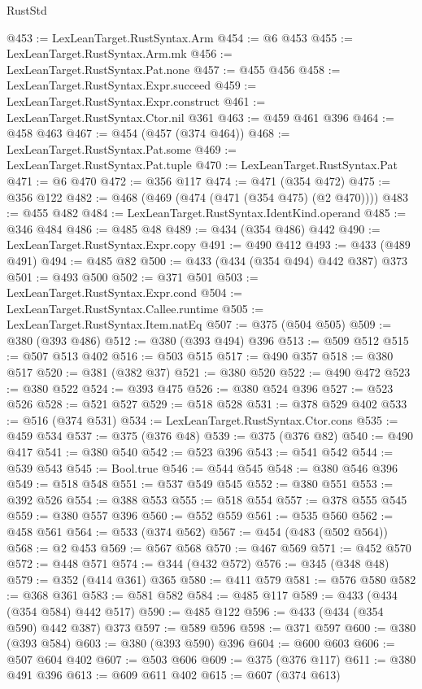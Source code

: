 \begin{lexlean}{RustStd}
\begin{coremodule}
@453 := LexLeanTarget.RustSyntax.Arm
@454 := @6 @453
@455 := LexLeanTarget.RustSyntax.Arm.mk
@456 := LexLeanTarget.RustSyntax.Pat.none
@457 := @455 @456
@458 := LexLeanTarget.RustSyntax.Expr.succeed
@459 := LexLeanTarget.RustSyntax.Expr.construct
@461 := LexLeanTarget.RustSyntax.Ctor.nil @361
@463 := @459 @461 @396
@464 := @458 @463
@467 := @454 (@457 (@374 @464))
@468 := LexLeanTarget.RustSyntax.Pat.some
@469 := LexLeanTarget.RustSyntax.Pat.tuple
@470 := LexLeanTarget.RustSyntax.Pat
@471 := @6 @470
@472 := @356 @117
@474 := @471 (@354 @472)
@475 := @356 @122
@482 := @468 (@469 (@474 (@471 (@354 @475) (@2 @470))))
@483 := @455 @482
@484 := LexLeanTarget.RustSyntax.IdentKind.operand
@485 := @346 @484
@486 := @485 @48
@489 := @434 (@354 @486) @442
@490 := LexLeanTarget.RustSyntax.Expr.copy
@491 := @490 @412
@493 := @433 (@489 @491)
@494 := @485 @82
@500 := @433 (@434 (@354 @494) @442 @387) @373
@501 := @493 @500
@502 := @371 @501
@503 := LexLeanTarget.RustSyntax.Expr.cond
@504 := LexLeanTarget.RustSyntax.Callee.runtime
@505 := LexLeanTarget.RustSyntax.Item.natEq
@507 := @375 (@504 @505)
@509 := @380 (@393 @486)
@512 := @380 (@393 @494) @396
@513 := @509 @512
@515 := @507 @513 @402
@516 := @503 @515
@517 := @490 @357
@518 := @380 @517
@520 := @381 (@382 @37)
@521 := @380 @520
@522 := @490 @472
@523 := @380 @522
@524 := @393 @475
@526 := @380 @524 @396
@527 := @523 @526
@528 := @521 @527
@529 := @518 @528
@531 := @378 @529 @402
@533 := @516 (@374 @531)
@534 := LexLeanTarget.RustSyntax.Ctor.cons
@535 := @459 @534
@537 := @375 (@376 @48)
@539 := @375 (@376 @82)
@540 := @490 @417
@541 := @380 @540
@542 := @523 @396
@543 := @541 @542
@544 := @539 @543
@545 := Bool.true
@546 := @544 @545
@548 := @380 @546 @396
@549 := @518 @548
@551 := @537 @549 @545
@552 := @380 @551
@553 := @392 @526
@554 := @388 @553
@555 := @518 @554
@557 := @378 @555 @545
@559 := @380 @557 @396
@560 := @552 @559
@561 := @535 @560
@562 := @458 @561
@564 := @533 (@374 @562)
@567 := @454 (@483 (@502 @564))
@568 := @2 @453
@569 := @567 @568
@570 := @467 @569
@571 := @452 @570
@572 := @448 @571
@574 := @344 (@432 @572)
@576 := @345 (@348 @48)
@579 := @352 (@414 @361) @365
@580 := @411 @579
@581 := @576 @580
@582 := @368 @361
@583 := @581 @582
@584 := @485 @117
@589 := @433 (@434 (@354 @584) @442 @517)
@590 := @485 @122
@596 := @433 (@434 (@354 @590) @442 @387) @373
@597 := @589 @596
@598 := @371 @597
@600 := @380 (@393 @584)
@603 := @380 (@393 @590) @396
@604 := @600 @603
@606 := @507 @604 @402
@607 := @503 @606
@609 := @375 (@376 @117)
@611 := @380 @491 @396
@613 := @609 @611 @402
@615 := @607 (@374 @613)

\end{coremodule}
\end{lexlean}

